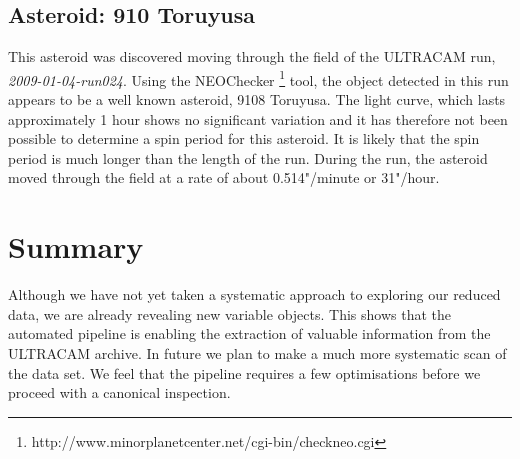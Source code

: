 \subsection{Asteroid: 910 Toruyusa}
  
This asteroid was discovered moving through the field of the ULTRACAM run, \emph{ 2009-01-04-run024}. Using the NEOChecker \footnote{http://www.minorplanetcenter.net/cgi-bin/checkneo.cgi} tool, the object detected in this run appears to be a well known asteroid, 9108 Toruyusa. The light curve, which lasts approximately 1 hour shows no significant variation and it has therefore not been possible to determine a spin period for this asteroid. It is likely that the spin period is much longer than the length of the run. During the run, the asteroid moved through the field at a rate of about  0.514"/minute or 31"/hour. 

 
  
\section{Summary}
Although we have not yet taken a systematic approach to exploring our reduced data, we are already revealing new variable objects. This shows that the automated pipeline is enabling the extraction of valuable information from the ULTRACAM archive. In future we plan to make a much more systematic scan of the data set. We feel that the pipeline requires a few optimisations before we proceed with a canonical inspection. 
